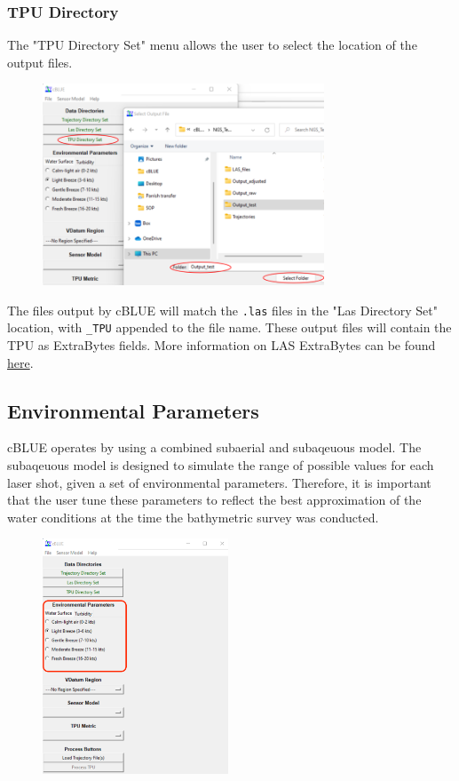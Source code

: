 \documentclass[11pt, a4paper]{article}
\begin{document}
\subsubsection{TPU Directory}
The "TPU Directory Set" menu allows the user to select the location of the output files. 

\begin{figure}[H]
    \centering
    \includegraphics[height=6cm]{figs/select_out.png}
\end{figure}

The files output by cBLUE will match the \texttt{.las} files in the "Las Directory Set" location, with \texttt{\_TPU} appended to the file name. These output files will contain the TPU as ExtraBytes fields. More information on LAS ExtraBytes can be found \href{https://www.asprs.org/divisions-committees/lidar-division/laser-las-file-format-exchange-activities}{here}.

\subsection{Environmental Parameters}
cBLUE operates by using a combined subaerial and subaqeuous model. The subaqeuous model is designed to simulate the range of possible values for each laser shot, given a set of environmental parameters. Therefore, it is important that the user tune these parameters to reflect the best approximation of the water conditions at the time the bathymetric survey was conducted. 

\begin{figure}[H]
    \centering
    \includegraphics[height=7cm]{figs/cblue_menu_env_params.png}
\end{figure}
\end{document}
